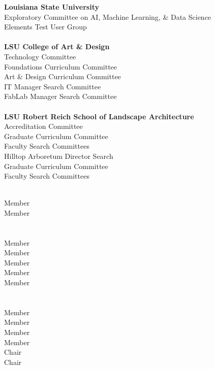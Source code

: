 \documentclass[10pt]{designcv}
\begin{document}


\begin{minipage}[t]{0.7\textwidth}
\raggedright
\textbf{Louisiana State University}\\
Exploratory Committee on AI, Machine Learning, \& Data Science\\
Elements Test User Group\\
\ \\
\textbf{LSU College of Art \& Design}\\
Technology Committee\\
Foundations Curriculum Committee\\
Art \& Design Curriculum Committee\\
IT Manager Search Committee\\
FabLab Manager Search Committee\\
\ \\
\textbf{LSU Robert Reich School of Landscape Architecture}\\ 
Accreditation Committee\\
Graduate Curriculum Committee\\
Faculty Search Committees\\
Hilltop Arboretum Director Search\\
Graduate Curriculum Committee\\
Faculty Search Committees\\
\end{minipage}
\hfill
\begin{minipage}[t]{0.125\textwidth} 
\ \\
Member\\
Member\\
\ \\
\ \\
Member\\
Member\\
Member\\
Member\\
Member\\
\ \\
\ \\
Member\\
Member\\
Member\\
Member\\
Chair\\
Chair\\
\end{minipage}
\end{document}
